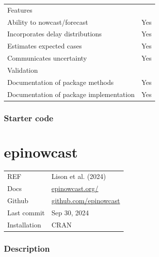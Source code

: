 \documentclass[
  letterpaper,
  DIV=11,
  numbers=noendperiod]{scrreprt}
\begin{document}
\begin{longtable}[]{@{}
  >{\raggedright\arraybackslash}p{}
  >{\raggedright\arraybackslash}p{}@{}}
\toprule\noalign{}
\endhead
\bottomrule\noalign{}
\endlastfoot
Features & \\
Ability to nowcast/forecast & Yes \\
Incorporates delay distributions & Yes \\
Estimates expected cases & Yes \\
Communicates uncertainty & Yes \\
Validation & \\
Documentation of package methods & Yes \\
Documentation of package implementation & Yes \\
\end{longtable}

\subsection*{Starter code}\label{starter-code-1}

\chapter*{epinowcast}\label{epinowcast}


\begin{longtable}[]{@{}
  >{\raggedright\arraybackslash}p{}
  >{\raggedright\arraybackslash}p{}@{}}
\toprule\noalign{}
\endhead
\bottomrule\noalign{}
\endlastfoot
REF & Lison et al. (2024) \\
Docs & \href{https://www.epinowcast.org/}{epinowcast.org/} \\
Github &
\href{https://github.com/epinowcast/epinowcast}{github.com/epinowcast} \\
Last commit & Sep 30, 2024 \\
Installation & CRAN \\
\end{longtable}

\subsection*{Description}\label{description-1}
\end{document}
